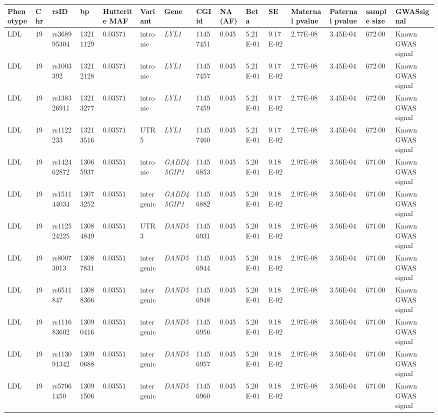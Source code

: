 \begin{landscape}
\begin{table}
	\ContinuedFloat
\centering
\begin{adjustbox}{max width=\linewidth}
\begin{tabular}{@{}p{2cm}|p{0.5cm}p{2cm}p{2cm}p{1.5cm}p{3cm}p{2.5cm}p{1.5cm}p{1cm}p{2cm}p{2cm}p{2cm}p{2cm}p{1.5cm}p{4cm}@{}}
\toprule 
Phenotype&Chr&rsID&bp&Hutterite MAF&Variant&Gene&CGI id&NA (AF)&Beta&SE&Maternal pvalue &Paternal pvalue &sample size&GWASsignal\\  \midrule
LDL&19&rs368995304&13211129&0.03571&intronic&\emph{LYL1}&11457451&0.045&5.21E-01&9.17E-02&2.77E-08&3.45E-04&672.00&Known GWAS signal\\ \hline
LDL&19&rs1003392&13212128&0.03571&intronic&\emph{LYL1}&11457457&0.045&5.21E-01&9.17E-02&2.77E-08&3.45E-04&672.00&Known GWAS signal\\ \hline
LDL&19&rs138326911&13213277&0.03571&intronic&\emph{LYL1}&11457459&0.045&5.21E-01&9.17E-02&2.77E-08&3.45E-04&672.00&Known GWAS signal\\ \hline
LDL&19&rs1122233&13213516&0.03571&UTR5&\emph{LYL1}&11457460&0.045&5.21E-01&9.17E-02&2.77E-08&3.45E-04&672.00&Known GWAS signal\\ \hline
LDL&19&rs142462872&13065937&0.03551&intronic&\emph{GADD45GIP1}&11456853&0.045&5.20E-01&9.18E-02&2.97E-08&3.56E-04&671.00&Known GWAS signal\\ \hline
LDL&19&rs151144034&13073252&0.03551&intergenic&\emph{GADD45GIP1}&11456882&0.045&5.20E-01&9.18E-02&2.97E-08&3.56E-04&671.00&Known GWAS signal\\ \hline
LDL&19&rs112524225&13084849&0.03551&UTR3&\emph{DAND5}&11456931&0.045&5.20E-01&9.18E-02&2.97E-08&3.56E-04&671.00&Known GWAS signal\\ \hline
LDL&19&rs80073013&13087831&0.03551&intergenic&\emph{DAND5}&11456944&0.045&5.20E-01&9.18E-02&2.97E-08&3.56E-04&671.00&Known GWAS signal\\ \hline
LDL&19&rs6511847&13088366&0.03551&intergenic&\emph{DAND5}&11456948&0.045&5.20E-01&9.18E-02&2.97E-08&3.56E-04&671.00&Known GWAS signal\\ \hline
LDL&19&rs111683602&13090416&0.03551&intergenic&\emph{DAND5}&11456956&0.045&5.20E-01&9.18E-02&2.97E-08&3.56E-04&671.00&Known GWAS signal\\ \hline
LDL&19&rs113091342&13090688&0.03551&intergenic&\emph{DAND5}&11456957&0.045&5.20E-01&9.18E-02&2.97E-08&3.56E-04&671.00&Known GWAS signal\\ \hline
LDL&19&rs57061450&13091506&0.03551&intergenic&\emph{DAND5}&11456960&0.045&5.20E-01&9.18E-02&2.97E-08&3.56E-04&671.00&Known GWAS signal\\ \hline

\end{tabular}
\end{adjustbox}
\end{table}
\end{landscape}
